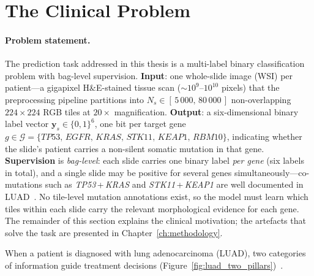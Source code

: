 \section{The Clinical Problem}
\label{sec:uc:clinical_problem}

\paragraph{Problem statement.}
The prediction task addressed in this thesis is a multi-label binary
classification problem with bag-level supervision.
\textbf{Input}: one whole-slide image (WSI) per patient---a
gigapixel H\&E-stained tissue scan ($\sim 10^9$--$10^{10}$ pixels)
that the preprocessing pipeline partitions into
$N_s \in [\,5\,000,\, 80\,000\,]$ non-overlapping
$224 \times 224$ RGB tiles at $20\times$ magnification.
\textbf{Output}: a six-dimensional binary label vector
$\mathbf{y}_s \in \{0,1\}^6$, one bit per target gene
$g \in \mathcal{G} = \{\textit{TP53},\allowbreak\, \textit{EGFR},\allowbreak\, \textit{KRAS},\allowbreak\, \textit{STK11},\allowbreak\, \textit{KEAP1},\allowbreak\, \textit{RBM10}\}$,
indicating whether the slide's patient carries a non-silent somatic
mutation in that gene.
\textbf{Supervision} is \emph{bag-level}: each slide carries one
binary label \emph{per gene} (six labels in total), and a single
slide may be positive for several genes simultaneously---co-mutations
such as \textit{TP53}\,+\,\textit{KRAS} and
\textit{STK11}\,+\,\textit{KEAP1} are well documented in
LUAD~\cite{tcga2014luad,skoulidis2018stk11pd1}.
No tile-level mutation annotations exist, so the model must learn
which tiles within each slide carry the relevant morphological
evidence for each gene.
The remainder of this section explains the clinical motivation;
the artefacts that solve the task are presented in
Chapter~\ref{ch:methodology}.

\bigskip

When a patient is diagnosed with lung adenocarcinoma (LUAD), two categories of information guide treatment decisions (Figure~\ref{fig:luad_two_pillars})~\cite{herbst2018lung}.

